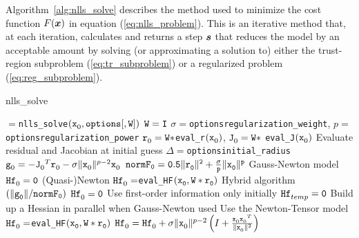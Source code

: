 \label{sec:Method}

Algorithm~\ref{alg:nlls_solve} describes the method used to minimize the cost function
$F(\vx)$ in equation (\ref{eq:nlls_problem}). This is an iterative method that, at each iteration, calculates and returns a step $\vs$ that reduces the model by an acceptable amount by solving (or approximating a solution to) either the trust-region subproblem (\ref{eq:tr_subproblem}) or a regularized problem (\ref{eq:reg_subproblem}). 

\begin{algorithm}
\caption{nlls\_solve}
\label{alg:nlls_solve}
  \begin{algorithmic}[1]
    $=${\tt nlls\_solve}$(\iter[0]{\tx},\text{\tt options}{\tt[,W]})$
    \State ${\tt W=I}$
    \EndIf
    \State $\sigma = ${\tt options\ct regularization\_weight}, $p = ${\tt options\ct regularization\_power}
    \State $\iter[0]{\tr} =  {\tt W * }${\tt eval\_r}$(\iter[0]{\tx})$, $\iter[0]{\tJ} = {\tt W *}$ {\tt eval\_J}$(\iter[0]{\tx})$    
    \Comment Evaluate residual and Jacobian at initial guess
    \State $\Delta = ${\tt options\ct initial\_radius}
    \State $ \iter[0]{\tg} = - {\iter[0]{\tJ}}^T\iter[0]{\tr} - \sigma \|\iter[0]{\tx}\|^{p-2}\iter[0]{\tx}$
    \State $\tt normF_0 = 0.5\|\iter[0]{\tr}\|^2 + \frac{\sigma}{p} \|\iter[0]{\tx}\|^p$
    \Comment Gauss-Newton model 
    \State $\iter[0]{\thess} = {\tt 0}$
    \Comment (Quasi-)Newton 
    \State $\iter[0]{\thess} = ${\tt eval\_HF}${\tt (\iter[0]{\tx},W * \iter[0]{\tr})}$
    \Comment Hybrid algorithm
    ${\tt (\| \iter[0]{\tg} \| / normF_0 )}$
    \State $\iter[0]{\thess} = {\tt 0}$
    \Comment Use first-order information only initially
    \State ${\iter[temp]{\thess}} = {\tt 0}$
    \Comment Build up a Hessian in parallel when Gauss-Newton used
    \Comment Use the Newton-Tensor model
    \State $\iter[0]{\thess} = ${\tt eval\_HF}${\tt (\iter[0]{\tx},W * \iter[0]{\tr})}$
    \State $\iter[0]{\thess}  = \iter[0]{\thess}  + \sigma \|\iter[0]{\tx}\|^{p-2}
    \left(I + \frac{{\iter[0]{\tx}}{\iter[0]{\tx}}^T}{\|\iter[0]{\tx}\|^2}\right)$

\end{algorithmic}
\end{algorithm}
